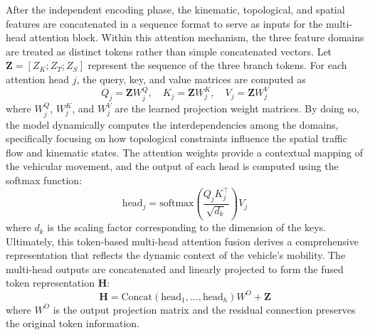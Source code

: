 \documentclass[journal]{IEEEtran}
\begin{document}
After the independent encoding phase, the kinematic, topological, and spatial features are concatenated in a sequence format to serve as inputs for the multi-head attention block. Within this attention mechanism, the three feature domains are treated as distinct tokens rather than simple concatenated vectors. Let $\mathbf{Z} = [Z_K; Z_T; Z_S]$ represent the sequence of the three branch tokens. For each attention head $j$, the query, key, and value matrices are computed as
\begin{equation}
Q_j = \mathbf{Z} W^Q_j, \quad K_j = \mathbf{Z} W^K_j, \quad V_j = \mathbf{Z} W^V_j
\label{eq:mha_proj}
\end{equation}
where $W^Q_j$, $W^K_j$, and $W^V_j$ are the learned projection weight matrices. By doing so, the model dynamically computes the interdependencies among the domains, specifically focusing on how topological constraints influence the spatial traffic flow and kinematic states. The attention weights provide a contextual mapping of the vehicular movement, and the output of each head is computed using the softmax function:
\begin{equation}
\text{head}_j = \text{softmax}\left(\frac{Q_j K_j^\top}{\sqrt{d_k}}\right) V_j
\label{eq:mha_head}
\end{equation}
where $d_k$ is the scaling factor corresponding to the dimension of the keys. Ultimately, this token-based multi-head attention fusion derives a comprehensive representation that reflects the dynamic context of the vehicle's mobility. The multi-head outputs are concatenated and linearly projected to form the fused token representation $\mathbf{H}$:
\begin{equation}
\mathbf{H} = \text{Concat}(\text{head}_1, \dots, \text{head}_h) W^O + \mathbf{Z}
\label{eq:mha_out}
\end{equation}
where $W^O$ is the output projection matrix and the residual connection preserves the original token information.
\end{document}
